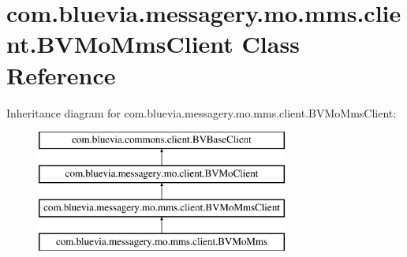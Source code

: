 \hypertarget{classcom_1_1bluevia_1_1messagery_1_1mo_1_1mms_1_1client_1_1BVMoMmsClient}{
\section{com.bluevia.messagery.mo.mms.client.BVMoMmsClient Class Reference}
\label{classcom_1_1bluevia_1_1messagery_1_1mo_1_1mms_1_1client_1_1BVMoMmsClient}
}
Inheritance diagram for com.bluevia.messagery.mo.mms.client.BVMoMmsClient:\begin{figure}[H]
\begin{center}
\leavevmode
\includegraphics[height=4.000000cm]{classcom_1_1bluevia_1_1messagery_1_1mo_1_1mms_1_1client_1_1BVMoMmsClient}
\end{center}
\end{figure}
